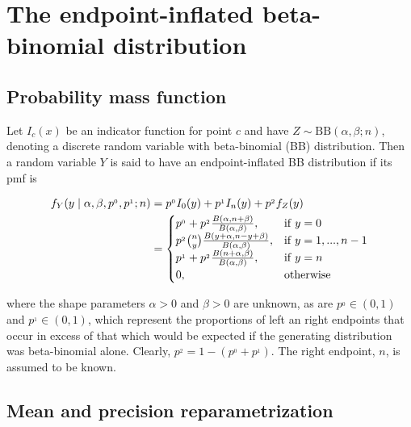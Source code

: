\chapter{The endpoint-inflated beta-binomial distribution}
\label{cap:distribution}

\section{Probability mass function}
\label{sec:pmf}

Let $I_c(x)$ be an indicator function for point $c$ and have $Z \sim \mathrm{BB}(\alpha, \beta; n)$, denoting a discrete random variable with beta-binomial (BB) distribution. Then a random variable $Y$ is said to have an endpoint-inflated BB distribution if its pmf is

\begin{equation}
\begin{split}
f_{Y}(y \mid \alpha , \beta , p^{_0}, p^{_1}; n)
&= p^{_0}I_0(y) + p^{_1}I_n(y) + p^{_2} f_{Z}(y)\\
&=	\begin{cases}
p^{_0} + p^{_2} {B(\alpha, n+\beta) \over B(\alpha,\beta)}, & \mathrm{if}\; y=0\\
p^{_2} {n \choose y} {B(y+\alpha, n-y+\beta) \over B(\alpha,\beta)}, & \mathrm{if}\; y=1,...,n-1\\
p^{_1} + p^{_2} {B(n+\alpha, \beta) \over B(\alpha,\beta)}, & \mathrm{if}\; y=n\\
0, & \mathrm{otherwise}
	\end{cases}
\end{split}
\label{densidad}
\end{equation}
	
\noindent where the shape parameters $\alpha > 0$ and $\beta > 0$ are unknown, as are $p^{_0} \in (0, 1)$ and $p^{_1} \in (0, 1)$, which represent the proportions of left an right endpoints that occur in excess of that which would be expected if the generating distribution was beta-binomial alone. Clearly, $p^{_2} = 1 -  (p^{_0}+p^{_1})$.  The right endpoint, $n$, is assumed to be known.\\

\section{Mean and precision reparametrization}
\label{sec:reparam}

